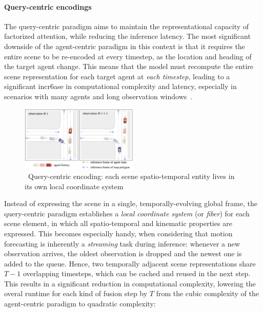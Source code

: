 \paragraph{Query-centric encodings}
The query-centric paradigm aims to maintain the representational capacity of factorized attention, while reducing the inference latency. The most significant downside of the agent-centric paradigm in this context is that it requires the entire scene to be re-encoded at every timestep, as the location and heading of the target agent change. This means that the model must recompute the entire scene representation for each target agent at \emph{each timestep}, leading to a significant incr6ase in computational complexity and latency, especially in scenarios with many agents and long observation windows~\cite{qcnetZhou2023}.\\

\begin{figure}[H]
  \centering
  \label{fig:qc_reference_frame}
  \includegraphics[width=0.5\textwidth]{figures/qc_reference_frame.png}
  \caption{\cite{qcnetZhou2023}~Query-centric encoding: each scene spatio-temporal entity lives in its own local coordinate system}
\end{figure}

Instead of expressing the scene in a single, temporally-evolving global frame, the query-centric paradigm establishes a \emph{local coordinate system} (or \emph{fiber}) for each scene element, in which all spatio-temporal and kinematic properties are expressed. This becomes especially handy, when considering that motion forecasting is inherently a \emph{streaming} task during inference: whenever a new observation arrives, the oldest observation is dropped and the newest one is added to the queue. Hence, two temporally adjacent scene representations share \(T{-}1\) overlapping timesteps, which can be cached and reused in the next step. This results in a significant reduction in computational complexity, lowering the overal runtime for each kind of fusion step by \( T \) from the cubic complexity of the agent-centric paradigm to quadratic complexity:


